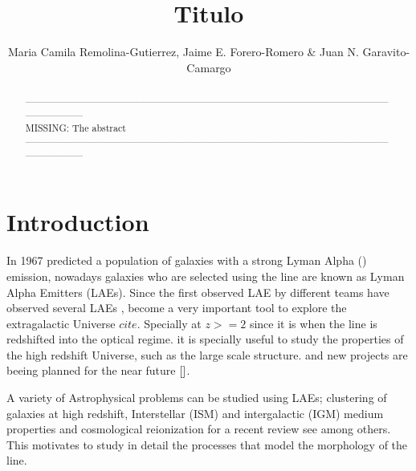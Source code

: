 \documentclass{latex/emulateapj}
\begin{document}
\title{Titulo}


\author{ Maria Camila Remolina-Gutierrez, Jaime E. Forero-Romero \& Juan N. Garavito-Camargo}


\begin{abstract}
\noindent ------------------------------------------------------------------------------------------------------------------------------------\\
MISSING: The abstract\\
------------------------------------------------------------------------------------------------------------------------------------\\
\end{abstract}

\section{Introduction}
\label{sec:intro}

In 1967 \cite{PartridgePeebles} predicted a population of galaxies with a strong 
Lyman Alpha (\lya) emission,  nowadays galaxies who are selected using the \lya 
line are known as Lyman Alpha Emitters (LAEs). Since the first 
observed LAE by \cite{DjorgovskiThompson} different teams have 
observed several LAEs \cite{Kulas12, Ostlin14}  ,  become a very important tool to 
explore the extragalactic Universe $cite{}$.  Specially at $z>=2$ since it is when the 
line is redshifted into the optical regime. it is specially useful to study the 
properties of the high redshift Universe, such as the large scale structure.
and new projects are beeing planned for the near future $\cite{}$.

A variety of Astrophysical problems can be studied using LAEs; clustering
of galaxies at high redshift, Interstellar (ISM) and intergalactic (IGM) medium 
properties and cosmological reionization for a recent review see \cite{review} 
among others. This motivates to study in 
detail the processes that model the morphology of the \lya line.
\end{document}
